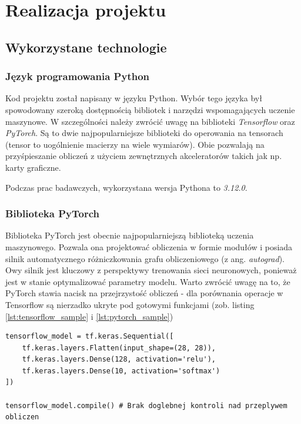 \chapter{Realizacja projektu}


\section{Wykorzystane technologie}

\subsection{Język programowania Python}

Kod projektu został napisany w języku Python. Wybór tego języka był spowodowany szeroką dostępnością bibliotek i
narzędzi wspomagających uczenie maszynowe. W szczególności należy zwrócić uwagę na biblioteki \textit{Tensorflow} oraz \textit{PyTorch}.
Są to dwie najpopularniejsze biblioteki do operowania na tensorach (tensor to uogólnienie macierzy na wiele wymiarów).
Obie pozwalają na przyśpieszanie obliczeń z użyciem zewnętrznych akceleratorów takich jak np. karty graficzne.

Podczas prac badawczych, wykorzystana wersja Pythona to \textit{3.12.0}.

\subsection{Biblioteka PyTorch}

Biblioteka PyTorch jest obecnie najpopularniejszą biblioteką uczenia maszynowego.
Pozwala ona projektować obliczenia w formie modułów i posiada silnik automatycznego różniczkowania grafu obliczeniowego (z ang. \textit{autograd}).
Owy silnik jest kluczowy z perspektywy trenowania sieci neuronowych, ponieważ jest w stanie optymalizować parametry modelu.
Warto zwrócić uwagę na to, że PyTorch stawia nacisk na przejrzystość obliczeń - dla porównania operacje w Tensorflow są nierzadko
ukryte pod gotowymi funkcjami (zob. listing \ref{lst:tensorflow_sample} i \ref{lst:pytorch_sample})

\begin{lstlisting}[language=ipython,caption={Przykładowa sieć neuronowa w Tensorflow},label={lst:tensorflow_sample}]
tensorflow_model = tf.keras.Sequential([
    tf.keras.layers.Flatten(input_shape=(28, 28)),
    tf.keras.layers.Dense(128, activation='relu'),
    tf.keras.layers.Dense(10, activation='softmax')
])

tensorflow_model.compile() # Brak doglebnej kontroli nad przeplywem obliczen
\end{lstlisting}


